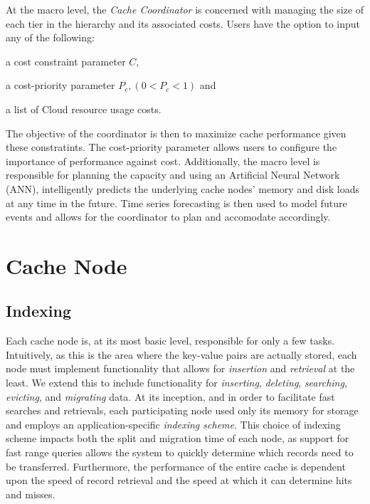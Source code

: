 At the macro level, the \emph{Cache Coordinator} is concerned with managing the
size of each tier in the hierarchy and its associated costs. Users have the
option to input any of the following:
\begin{inparaenum}[(1)]
  \item a cost constraint parameter $C$,
  \item a cost-priority parameter $P_c, (0 < P_c < 1)$ and
  \item a list of Cloud resource usage costs.
\end{inparaenum}
The objective of the coordinator is then to maximize cache performance given
these constratints. The cost-priority parameter allows users to configure the
importance of performance against cost. Additionally, the macro level is
responsible for planning the capacity and using an Artificial Neural Network
(ANN), intelligently predicts the underlying cache nodes' memory and disk loads
at any time in the future. Time series forecasting is then used to model future
events and allows for the coordinator to plan and accomodate accordingly.


\section{Cache Node} %
\label{sec:Cache_Node}

\subsection{Indexing}
\label{sub:cache_indexing}
Each cache node is, at its most basic level, responsible for only a few tasks.
Intuitively, as this is the area where the key-value pairs are actually stored,
each node must implement functionality that allows for \emph{insertion} and
\emph{retrieval} at the least. We extend this to include functionality for
\emph{inserting}, \emph{deleting}, \emph{searching}, \emph{evicting}, and
\emph{migrating} data. At its inception, and in order to facilitate fast
searches and retrievals, each participating node used only its memory for
storage and employs an application-specific \emph{indexing scheme}. This choice
of indexing scheme impacts both the split and migration time of each node, as
support for fast range queries allows the system to quickly determine which
records need to be transferred. Furthermore, the performance of the entire
cache is dependent upon the speed of record retrieval and the speed at which it
can determine hits and misses.

